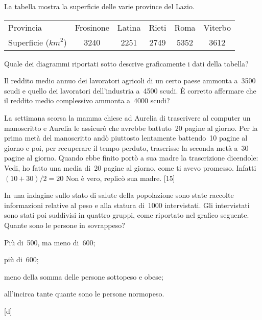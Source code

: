 \begin{esercizio}
\label{ese:A.59}
La tabella mostra la superficie delle varie province del Lazio.
\begin{center}
 \begin{tabular}{l*{5}{c}}
 \toprule
 Provincia & Frosinone & Latina & Rieti & Roma & Viterbo\\
 Superficie (\(\unit{km}^2\)) & 3240& 2251& 2749& 5352& 3612\\
 \bottomrule
 \end{tabular}
\end{center}
Quale dei diagrammi riportati sotto descrive graficamente i dati della 
tabella?
\begin{center}
 
\end{center}

\end{esercizio}

\begin{esercizio}
\label{ese:A.48}
Il reddito medio annuo dei lavoratori agricoli di un certo paese ammonta 
a~3500 scudi e quello dei lavoratori dell'industria
a~4500 scudi. È corretto affermare che il reddito medio complessivo ammonta 
a~4000 scudi?
\end{esercizio}

\begin{esercizio}
\label{ese:A.49}
La settimana scorsa la mamma chiese ad Aurelia di trascrivere al computer 
un manoscritto e Aurelia le assicurò che avrebbe
battuto~20 pagine al giorno. Per la prima metà del manoscritto andò 
piuttosto lentamente battendo~10 pagine al giorno e poi,
per recuperare il tempo perduto, trascrisse la seconda metà a~30 pagine al 
giorno.
Quando ebbe finito portò a sua madre la trascrizione dicendole: Vedi, ho 
fatto una media di~20 pagine al giorno,
come ti avevo promesso. Infatti~\((10+30)/2=20\) Non è vero, replicò sua 
madre.
\hfill [15]
\end{esercizio}

\begin{multicols}{2}
\begin{esercizio}
\label{ese:A.50}
In una indagine sullo stato di salute della popolazione sono state raccolte 
informazioni relative al peso e
alla statura di~1000 intervistati. Gli intervistati sono stati poi 
suddivisi in quattro gruppi,
come riportato nel grafico seguente. Quante sono le persone in sovrappeso?

\begin{enumeratea}
 \item Più di~500, ma meno di~600;
 \item più di~600;
 \item meno della somma delle persone sottopeso e obese;
 \item all'incirca tante quante sono le persone normopeso.
\end{enumeratea}
\begin{center}
 
\end{center}
\hfill [d]
\end{esercizio}
\end{multicols}

